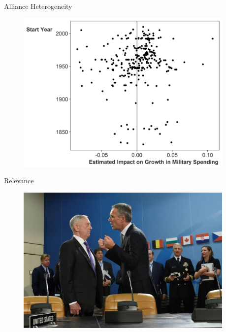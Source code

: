 \documentclass{beamer}
\begin{document}

\begin{frame}{Alliance Heterogeneity}

\begin{figure}
	\centering
		\includegraphics[width=0.95\textwidth]{lambda-est-full.png}
	\label{fig:lambda-est-full}
\end{figure}


 \end{frame}



\begin{frame}{Relevance}

\begin{figure}[htbp]
	\centering
		\includegraphics[width=0.95\textwidth]{mattis-nato.jpg}
	\label{fig:mattis-nato}
\end{figure}


\end{frame}
\end{document}
